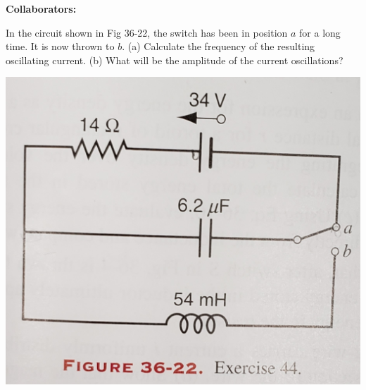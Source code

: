 \documentclass[11pt,letterpaper,boxed]{hmcpset}
\begin{document}
	
	\noindent\textbf{Collaborators:} 
	
	
	\begin{problem} [HRK E6.44] In the circuit shown in Fig 36-22, the switch has been in position $a$ for a long time. It is now thrown to $b$. (a) Calculate the frequency of the resulting oscillating current. (b) What will be the amplitude of the current oscillations?
	\begin{center}
	    \includegraphics[scale=.075]{20191206_143722.jpg}
	    
	\end{center}
		
	\end{problem}
	
	\begin{solution}
		\vfill
	\end{solution}
	\newpage
\end{document}

